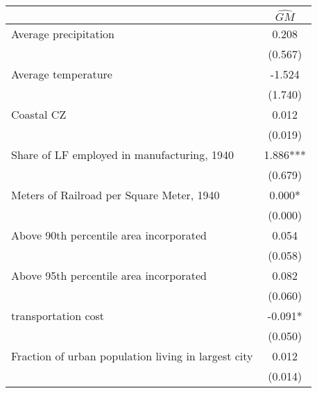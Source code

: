  \begin{tabular}{l*{1}{c}} \toprule
                &\multicolumn{1}{c}{$\widehat{GM}$}\\
\midrule
Average precipitation&    0.208   \\
                &  (0.567)   \\
\addlinespace
Average temperature&   -1.524   \\
                &  (1.740)   \\
\addlinespace
Coastal CZ      &    0.012   \\
                &  (0.019)   \\
\addlinespace
Share of LF employed in manufacturing, 1940&    1.886***\\
                &  (0.679)   \\
\addlinespace
Meters of Railroad per Square Meter, 1940&    0.000*  \\
                &  (0.000)   \\
\addlinespace
Above 90th percentile area incorporated&    0.054   \\
                &  (0.058)   \\
\addlinespace
Above 95th percentile area incorporated&    0.082   \\
                &  (0.060)   \\
\addlinespace
1920 transportation cost&   -0.091*  \\
                &  (0.050)   \\
\addlinespace
Fraction of urban population living in largest city&    0.012   \\
                &  (0.014)   \\
       \bottomrule \end{tabular}
